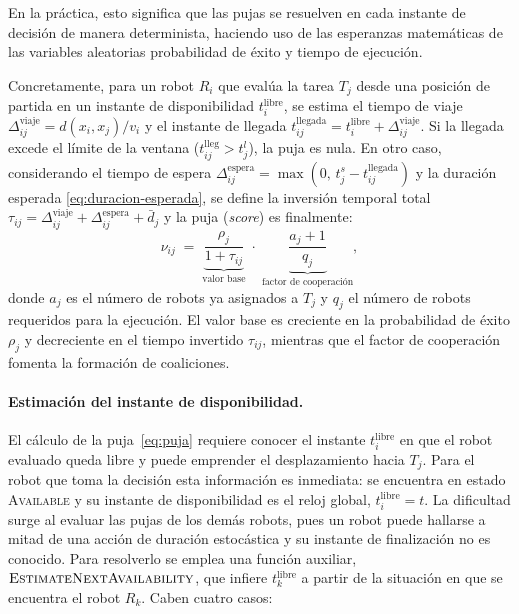 En la práctica, esto significa que las pujas se resuelven en cada instante de decisión de manera determinista, haciendo uso de las esperanzas matemáticas de las variables aleatorias probabilidad de éxito y tiempo de ejecución.

Concretamente, para un robot $R_i$ que evalúa la tarea $T_j$ desde una posición de partida en un instante de disponibilidad $t_i^{\mathrm{libre}}$, se estima el tiempo de viaje $\Delta_{ij}^{\mathrm{viaje}}=d(x_i,x_j)/v_i$ y el instante de llegada $t_{ij}^{\mathrm{llegada}}=t_i^{\mathrm{libre}}+\Delta_{ij}^{\mathrm{viaje}}$. Si la llegada excede el límite de la ventana ($t_{ij}^{\mathrm{lleg}}>t_j^{l}$), la puja es nula. En otro caso, considerando el tiempo de espera $\Delta_{ij}^{\mathrm{espera}}=\max(0,\,t_j^{s}-t_{ij}^{\mathrm{llegada}})$ y la duración esperada \eqref{eq:duracion-esperada}, se define la inversión temporal total $\tau_{ij}=\Delta_{ij}^{\mathrm{viaje}}+\Delta_{ij}^{\mathrm{espera}}+\bar{d}_j$ y la puja (\textit{score}) es finalmente:
\begin{equation} \label{eq:puja}
    \nu_{ij}
    \;=\;
    \underbrace{\frac{\rho_j}{1+\tau_{ij}}}_{\text{valor base}}
    \;\cdot\;
    \underbrace{\frac{a_j+1}{q_j}}_{\text{factor de cooperación}} ,
\end{equation}
donde $a_j$ es el número de robots ya asignados a $T_j$ y $q_j$ el número de robots requeridos para la ejecución. El valor base es creciente en la probabilidad de éxito $\rho_j$ y decreciente en el tiempo invertido $\tau_{ij}$, mientras que el factor de cooperación fomenta la formación de coaliciones.

\paragraph{Estimación del instante de disponibilidad.} El cálculo de la puja~\eqref{eq:puja} requiere conocer el instante $t_i^{\mathrm{libre}}$ en que el robot evaluado queda libre y puede emprender el desplazamiento hacia $T_j$. Para el robot que toma la decisión esta información es inmediata: se encuentra en estado \textsc{Available} y su instante de disponibilidad es el reloj global, $t_i^{\mathrm{libre}}=t$. La dificultad surge al evaluar las pujas de los demás robots, pues un robot puede hallarse a mitad de una acción de duración estocástica y su instante de finalización no es conocido. Para resolverlo se emplea una función auxiliar, $\textsc{EstimateNextAvailability}$, que infiere $t_k^{\mathrm{libre}}$ a partir de la situación en que se encuentra el robot $R_k$. Caben cuatro casos:
 
